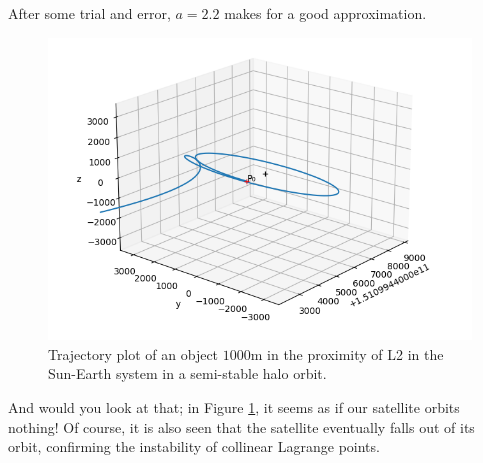 \begin{samepage}
After some trial and error, $a = 2.2$ makes for a good approximation.
\begin{figure}[H]
	\centering
	\includegraphics[scale=0.52]{3dplot2.png}
	\caption{Trajectory plot of an object $1000\si{\metre}$ in the proximity of L2 in the Sun-Earth system in a semi-stable halo orbit.}
	\label{fig:3dplot2}
\end{figure}
\end{samepage}
And would you look at that; in Figure \ref{fig:3dplot2}, it seems as if our satellite orbits nothing!
Of course, it is also seen that the satellite eventually falls out of its orbit, confirming the instability of collinear Lagrange points.

